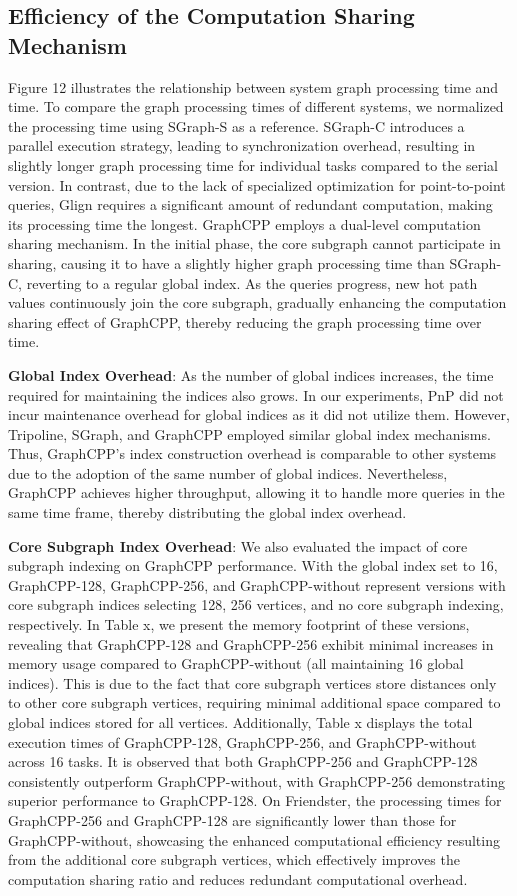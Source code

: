 \documentclass[lettersize,journal]{IEEEtran} %
\begin{document}
\subsection{Efficiency of the Computation Sharing Mechanism}
Figure 12 illustrates the relationship between system graph processing time and time. To compare the graph processing times of different systems, we normalized the processing time using SGraph-S as a reference. SGraph-C introduces a parallel execution strategy, leading to synchronization overhead, resulting in slightly longer graph processing time for individual tasks compared to the serial version. In contrast, due to the lack of specialized optimization for point-to-point queries, Glign requires a significant amount of redundant computation, making its processing time the longest. GraphCPP employs a dual-level computation sharing mechanism. In the initial phase, the core subgraph cannot participate in sharing, causing it to have a slightly higher graph processing time than SGraph-C, reverting to a regular global index. As the queries progress, new hot path values continuously join the core subgraph, gradually enhancing the computation sharing effect of GraphCPP, thereby reducing the graph processing time over time.

{\bf{Global Index Overhead}}: As the number of global indices increases, the time required for maintaining the indices also grows. In our experiments, PnP did not incur maintenance overhead for global indices as it did not utilize them. However, Tripoline\cite{tripoline}, SGraph\cite{sgraph}, and GraphCPP employed similar global index mechanisms. Thus, GraphCPP's index construction overhead is comparable to other systems due to the adoption of the same number of global indices. Nevertheless, GraphCPP achieves higher throughput, allowing it to handle more queries in the same time frame, thereby distributing the global index overhead.

{\bf{Core Subgraph Index Overhead}}: We also evaluated the impact of core subgraph indexing on GraphCPP performance. With the global index set to 16, GraphCPP-128, GraphCPP-256, and GraphCPP-without represent versions with core subgraph indices selecting 128, 256 vertices, and no core subgraph indexing, respectively. In Table x, we present the memory footprint of these versions, revealing that GraphCPP-128 and GraphCPP-256 exhibit minimal increases in memory usage compared to GraphCPP-without (all maintaining 16 global indices). This is due to the fact that core subgraph vertices store distances only to other core subgraph vertices, requiring minimal additional space compared to global indices stored for all vertices. Additionally, Table x displays the total execution times of GraphCPP-128, GraphCPP-256, and GraphCPP-without across 16 tasks. It is observed that both GraphCPP-256 and GraphCPP-128 consistently outperform GraphCPP-without, with GraphCPP-256 demonstrating superior performance to GraphCPP-128. On Friendster, the processing times for GraphCPP-256 and GraphCPP-128 are significantly lower than those for GraphCPP-without, showcasing the enhanced computational efficiency resulting from the additional core subgraph vertices, which effectively improves the computation sharing ratio and reduces redundant computational overhead.
\end{document}
